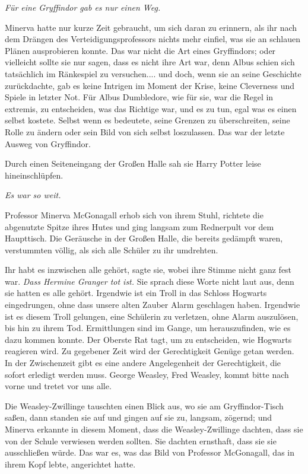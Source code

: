 \emph{Für eine Gryffindor gab es nur einen Weg.}

Minerva hatte nur kurze Zeit gebraucht, um sich daran zu erinnern, als ihr nach
dem Drängen des Verteidigungsprofessors nichts mehr einfiel, was sie an schlauen
Plänen ausprobieren konnte. Das war nicht die Art eines Gryffindors; oder
vielleicht sollte sie nur sagen, dass es nicht ihre Art war, denn Albus schien
sich tatsächlich im Ränkespiel zu versuchen.... und doch, wenn sie an seine
Geschichte zurückdachte, gab es keine Intrigen im Moment der Krise, keine
Cleverness und Spiele in letzter Not. Für Albus Dumbledore, wie für sie, war die
Regel in extremis, zu entscheiden, was das Richtige war, und es zu tun, egal was
es einen selbst kostete. Selbst wenn es bedeutete, seine Grenzen zu
überschreiten, seine Rolle zu ändern oder sein Bild von sich selbst loszulassen.
Das war der letzte Ausweg von Gryffindor.

Durch einen Seiteneingang der Großen Halle sah sie Harry Potter leise
hineinschlüpfen.

\emph{Es war so weit.}

Professor Minerva McGonagall erhob sich von ihrem Stuhl, richtete die abgenutzte
Spitze ihres Hutes und ging langsam zum Rednerpult vor dem Haupttisch. Die
Geräusche in der Großen Halle, die bereits gedämpft waren, verstummten völlig,
als sich alle Schüler zu ihr umdrehten.

\glqq{}Ihr habt es inzwischen alle gehört\grqq{}, sagte sie, wobei ihre Stimme
nicht ganz fest war. \emph{Dass Hermine Granger tot ist.} Sie sprach diese Worte
nicht laut aus, denn sie hatten es alle gehört. \glqq{}Irgendwie ist ein Troll in
das Schloss Hogwarts eingedrungen, ohne dass unsere alten Zauber Alarm
geschlagen haben. Irgendwie ist es diesem Troll gelungen, eine Schülerin zu
verletzen, ohne Alarm auszulösen, bis hin zu ihrem Tod. Ermittlungen sind im
Gange, um herauszufinden, wie es dazu kommen konnte. Der Oberste Rat tagt, um zu
entscheiden, wie Hogwarts reagieren wird. Zu gegebener Zeit wird der
Gerechtigkeit Genüge getan werden. In der Zwischenzeit gibt es eine andere
Angelegenheit der Gerechtigkeit, die sofort erledigt werden muss. George
Weasley, Fred Weasley, kommt bitte nach vorne und tretet vor uns alle.\grqq{}

Die Weasley-Zwillinge tauschten einen Blick aus, wo sie am Gryffindor-Tisch
saßen, dann standen sie auf und gingen auf sie zu, langsam, zögernd; und Minerva
erkannte in diesem Moment, dass die Weasley-Zwillinge dachten, dass sie von der
Schule verwiesen werden sollten. Sie dachten ernsthaft, dass sie sie
ausschließen würde. Das war es, was das Bild von Professor McGonagall, das in
ihrem Kopf lebte, angerichtet hatte.

